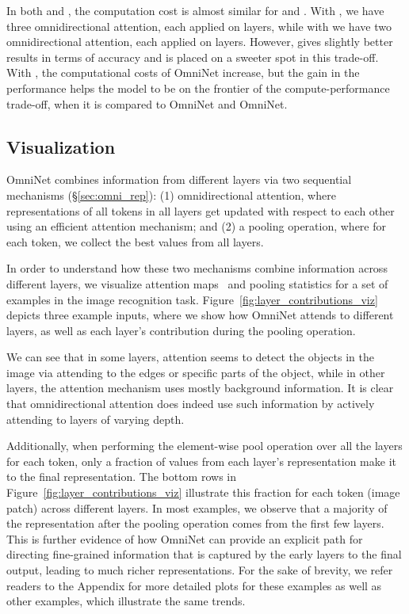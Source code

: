 \documentclass{article}
\begin{document}
In both  and , the computation cost is almost similar for  and . With , we have three omnidirectional attention, each applied on  layers, while with  we have two omnidirectional attention, each applied on  layers. However,  gives slightly better results in terms of accuracy and is placed on a sweeter spot in this trade-off. 
With , the computational costs of OmniNet increase, but the gain in the performance helps the model to be on the frontier of the compute-performance trade-off, when it is compared to  OmniNet and OmniNet.

\subsection{Visualization}


OmniNet combines information from different layers via two sequential mechanisms (\S\ref{sec:omni_rep}): (1) omnidirectional attention, where representations of all tokens in all layers get updated with respect to each other using an efficient attention mechanism; and (2) a pooling operation, where for each token, we collect the best values from all layers. 

In order to understand how these two mechanisms combine information across different layers, we visualize attention maps~\citep{abnar-zuidema-2020-quantifying} and pooling statistics for a set of examples in the image recognition task. 
Figure~\ref{fig:layer_contributions_viz} depicts three example inputs, where we show how OmniNet attends to different layers, as well as each layer's contribution during the pooling operation.

We can see that in some layers, attention seems to detect the objects in the image via attending to the edges or specific parts of the object, while in other layers, the attention mechanism uses mostly background information. It is clear that omnidirectional attention does indeed use such information by actively attending to layers of varying depth.

Additionally, when performing the element-wise pool operation over all the layers for each token, only a fraction of values from each layer's representation make it to the final representation. The bottom rows in Figure~\ref{fig:layer_contributions_viz} illustrate this fraction for each token (image patch) across different layers. In most examples, we observe that a majority of the representation after the pooling operation comes from the first few layers. This is further evidence of how OmniNet can provide an explicit path for directing fine-grained information that is captured by the early layers to the final output, leading to much richer representations.
For the sake of brevity, we refer readers to the Appendix for more detailed plots for these examples as well as other examples, which illustrate the same trends.
\vspace{-6pt}
\end{document}
